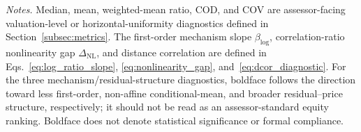 \documentclass[10pt]{article}
\theoremstyle{definition}
\newcommand{\1}{\mathbf{1}}
\begin{document}
{\begin{table}[!htbp]
\vspace{1mm}
\begin{minipage}{\textwidth}
\scriptsize
\emph{Notes.}
Median, mean, weighted-mean ratio, COD, and COV are assessor-facing valuation-level or horizontal-uniformity diagnostics defined in Section~\ref{subsec:metrics}. The first-order mechanism slope $\beta_{\log}$, correlation-ratio nonlinearity gap $\Delta_{\mathrm{NL}}$, and distance correlation are defined in Eqs.~\eqref{eq:log_ratio_slope}, \eqref{eq:nonlinearity_gap}, and~\eqref{eq:dcor_diagnostic}. For the three mechanism/residual-structure diagnostics, boldface follows the direction toward less first-order, non-affine conditional-mean, and broader residual--price structure, respectively; it should not be read as an assessor-standard equity ranking. Boldface does not denote statistical significance or formal compliance.
\end{minipage}
\end{table}
}
\end{document}

